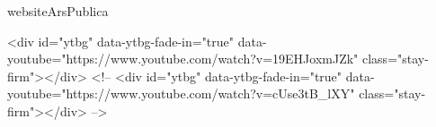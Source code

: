 \E websiteArsPublica


\backGVideo \ml
        <div id="ytbg" data-ytbg-fade-in="true" data-youtube="https://www.youtube.com/watch?v=19EHJoxmJZk" class="stay-firm"></div>
        <!-- <div id="ytbg" data-ytbg-fade-in="true" data-youtube="https://www.youtube.com/watch?v=cUse3tB_lXY" class="stay-firm"></div> -->

\fin


 

